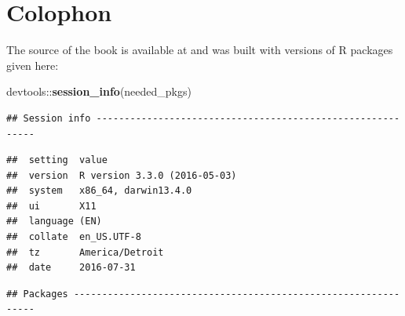 \documentclass[]{tufte-book}
\newenvironment{Shaded}{\begin{snugshade}}{\end{snugshade}}
\newcommand{\KeywordTok}[1]{\textcolor[rgb]{0.13,0.29,0.53}{\textbf{{#1}}}}
\newcommand{\NormalTok}[1]{{#1}}
\begin{document}
\section{Colophon}\label{colophon}

The source of the book is available at and was built with versions of R
packages given here:

\begin{Shaded}
\begin{Highlighting}[]
\NormalTok{devtools::}\KeywordTok{session_info}\NormalTok{(needed_pkgs)}
\end{Highlighting}
\end{Shaded}

\begin{verbatim}
## Session info -----------------------------------------------------------
\end{verbatim}

\begin{verbatim}
##  setting  value                       
##  version  R version 3.3.0 (2016-05-03)
##  system   x86_64, darwin13.4.0        
##  ui       X11                         
##  language (EN)                        
##  collate  en_US.UTF-8                 
##  tz       America/Detroit             
##  date     2016-07-31
\end{verbatim}

\begin{verbatim}
## Packages ---------------------------------------------------------------
\end{verbatim}
\end{document}

